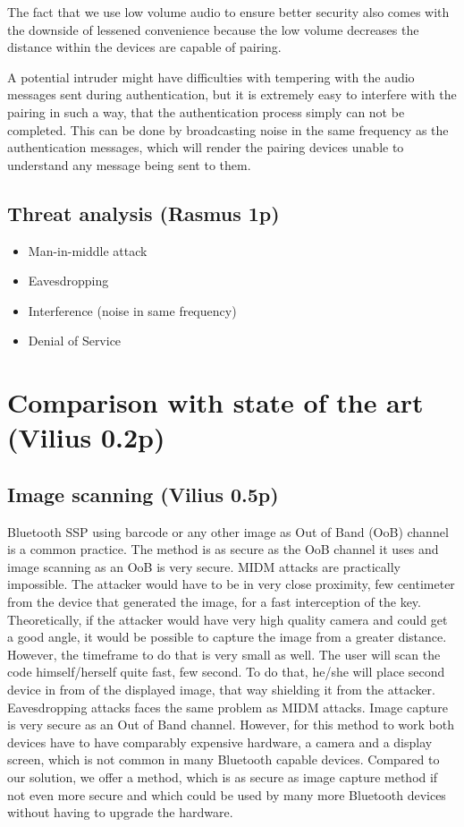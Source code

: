 \documentclass[12pt]{article}
\begin{document}
The fact that we use low volume audio to ensure better security also comes with the downside of lessened convenience because the low volume decreases the distance within the devices are capable of pairing.

A potential intruder might have difficulties with tempering with the audio messages sent during authentication, but it is extremely easy to interfere with the pairing in such a way, that the authentication process simply can not be completed. This can be done by broadcasting noise in the same frequency as the authentication messages, which will render the pairing devices unable to understand any message being sent to them.


\subsection{Threat analysis (Rasmus 1p)}
\label{sub:Threat analysis}

\begin{itemize}
    \item Man-in-middle attack
    \item Eavesdropping
    \item Interference (noise in same frequency)
    \item Denial of Service
\end{itemize}

\newpage

\section{Comparison with state of the art (Vilius 0.2p)}
\label{sec:Comparison with state of the art}

\subsection{Image scanning (Vilius 0.5p)}
\label{sub:Image scanning}

Bluetooth SSP using barcode or any other image as Out of Band (OoB) channel is a common practice. The method is as secure as the OoB channel it uses and image scanning as an OoB is very secure. MIDM attacks are practically impossible. The attacker would have to be in very close proximity, few centimeter from the device that generated the image, for a fast interception of the key. Theoretically, if the attacker would have very high quality camera and could get a good angle, it would be possible to capture the image from a greater distance. However, the timeframe to do that is very small as well. The user will scan the code himself/herself quite fast, few second. To do that, he/she will place second device in from of the displayed image, that way shielding it from the attacker. Eavesdropping attacks faces the same problem as MIDM attacks.
Image capture is very secure as an Out of Band channel. However, for this method to work both devices have to have comparably expensive hardware, a camera and a display screen, which is not common in many Bluetooth capable devices. Compared to our solution, we offer a method, which is as secure as image capture method if not even more secure and which could be used by many more Bluetooth devices without having to upgrade the hardware.
\end{document}
